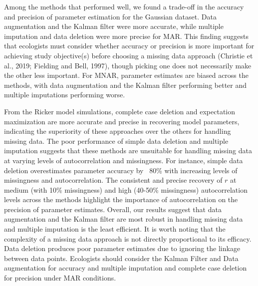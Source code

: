 

Among the methods that performed well, we found a trade-off in the accuracy and precision of parameter estimation for the Gaussian dataset. Data augmentation and the Kalman filter were more accurate, while multiple imputation and data deletion were more precise for MAR. This finding suggests that ecologists must consider whether accuracy or precision is more important for achieving study objective(s) before choosing a missing data approach (Christie et al., 2019; Fielding and Bell, 1997), though picking one does not necessarily make the other less important. For MNAR, parameter estimates are biased across the methods, with data augmentation and the Kalman filter performing better and multiple imputations performing worse. 


From the Ricker model simulations, complete case deletion and expectation maximization are more accurate and precise in recovering model parameters, indicating the superiority of these approaches over the others for handling missing data. The poor performance of simple data deletion and multiple imputation suggests that these methods are unsuitable for handling missing data at varying levels of autocorrelation and missingness. For instance, simple data deletion overestimates parameter accuracy by ~80\% with increasing levels of missingness and autocorrelation. The consistent and precise recovery of $r$ at medium (with 10\% missingness) and high (40-50\% missingness) autocorrelation levels across the methods highlight the importance of autocorrelation on the precision of parameter estimates. Overall, our results suggest that data augmentation and the Kalman filter are most robust in handling missing data and multiple imputation is the least efficient. It is worth noting that the complexity of a missing data approach is not directly proportional to its efficacy. Data deletion produces poor parameter estimates due to ignoring the linkage between data points. Ecologists should consider the Kalman Filter and Data augmentation for accuracy and multiple imputation and complete case deletion for precision under MAR conditions.


